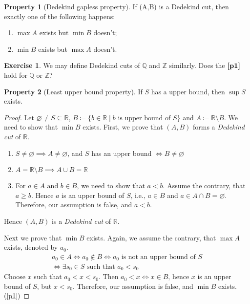 \documentclass{article}
\theoremstyle{definition}
\newtheorem{property}{Property}
\newtheorem{exercise}{Exercise}
\begin{document}
\begin{property}[Dedekind gapless property]\label{p1}
    If (A,B) is a Dedekind cut, then exactly one of the following happens:
    \begin{enumerate}
        \item $\max A$ exists but $\min B$ doesn't;
        \item $\min B$ exists but $\max A$ doesn't.
    \end{enumerate}
\end{property}

\begin{exercise}
    We may define Dedekind cuts of $\mathbb{Q}$ and $\mathbb{Z}$ similarly.
    Does the $\textbf{\autoref{p1}}$ hold for $\mathbb{Q}$ or $\mathbb{Z}$?
\end{exercise}

\begin{property}[Least upper bound property]
    If $S$ has a upper bound, then $\sup S$ exists.
\end{property}

\begin{proof}
    Let $\varnothing \neq S \subseteq \mathbb{R}$, $B\coloneqq\{b\in\mathbb{R}\mid b \text{ is upper bound of } S\}$ and $A\coloneqq\mathbb{R} \setminus B.$
    We need to show that $\min B$ exists. First, we prove that $(A,B)$ forms a \emph{Dedekind cut} of $\mathbb{R}$.
    \begin{enumerate}
        \item $S \neq \varnothing \implies A \neq \varnothing$, and $S$ has an upper bound $\iff B  \neq \varnothing$
        \item $A=\mathbb{R}\setminus B \implies A\cup B = \mathbb{R}$
        \item For $a\in A \text{ and } b\in B$, we need to show that $a<b$. 
            Assume the contrary, that $a\geq b$. Hence $a$ is an upper bound of $S$, i.e., $a\in B$ and
            $a\in A\cap B = \varnothing$. Therefore, our assumption is false, and $a < b$.
    \end{enumerate}
    Hence $(A,B)$ is a \emph{Dedekind cut} of $\mathbb{R}$.

    Next we prove that $\min B$ exists.
    Again, we assume the contrary, that $\max A$ exists, denoted by $a_0$.
    \begin{gather*}
        a_0\in A \iff a_0 \notin B \iff a_0 \text{ is not an upper bound of } S \\
        \iff \exists s_0 \in S \text{ such that } a_0<s_0
    \end{gather*}
    Choose $x$ such that $a_0<x<s_0$. Then $a_0<x \iff x\in B$, hence $x$ is an upper bound of $S$, but $x < s_0$.
    Therefore, our assumption is false, and $\min B$ exists.(\autoref{p1})
\end{proof}
\end{document}
